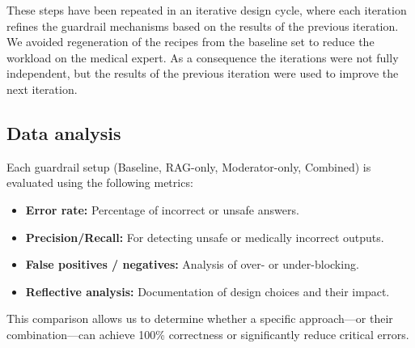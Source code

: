 These steps have been repeated in an iterative design cycle, where each iteration refines the guardrail mechanisms based on the results of the previous iteration.
We avoided regeneration of the recipes from the baseline set to reduce the workload on the medical expert.
As a consequence the iterations were not fully independent, but the results of the previous iteration were used to improve the next iteration.

\subsection{Data analysis}

Each guardrail setup (Baseline, RAG-only, Moderator-only, Combined) is evaluated using the following metrics:

\begin{itemize}
    \item \textbf{Error rate:} Percentage of incorrect or unsafe answers.
    \item \textbf{Precision/Recall:} For detecting unsafe or medically incorrect outputs.
    \item \textbf{False positives / negatives:} Analysis of over- or under-blocking.
    \item \textbf{Reflective analysis:} Documentation of design choices and their impact.
\end{itemize}

This comparison allows us to determine whether a specific approach—or their combination—can achieve 100\% correctness or significantly reduce critical errors.
